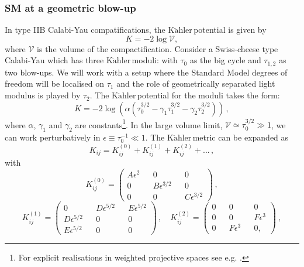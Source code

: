 \documentclass[11pt,a4paper]{article}
\newcommand{\V}{\mathcal{V}}
\newcommand{\Kahler}{\ensuremath{\text{K}\ddot{\text{a}}\text{hler}\,}}
\begin{document}
\subsubsection{SM at a geometric blow-up}
\label{twoblow}

In type IIB Calabi-Yau compatifications, the \Kahler potential is given by
%
\begin{equation}
    K = -2  \log {\mathcal{V}},
\end{equation}
%
where ${\mathcal{V}}$ is the volume of the compactification. Consider  a Swiss-cheese type Calabi-Yau which has three \Kahler moduli: with $\tau_0$ as the big cycle and $\tau_{1,2}$ as two blow-ups.  We  will work with a setup where the Standard Model degrees of freedom will be localised on $\tau_1$ and the role of geometrically separated light modulus is played by $\tau_2$. The \Kahler potential for the moduli takes the form:
\begin{equation}
K = -2 \log\left(\alpha\left(\tau_0^{3/2} - \gamma_1 \tau_1^{3/2} - \gamma_2 \tau_2^{3/2}\right)\right) \,,
\end{equation}
where  $\alpha$, $\gamma_1$ and $\gamma_2$ are constants\footnote{For explicit realisations in weighted projective spaces see  e.g. \cite{Blumenhagen:2007sm}.}. In the large volume limit, $\V \simeq \tau_0^{3/2} \gg 1$, we can work perturbatively in $\epsilon \equiv \tau_0^{-1} \ll 1$. The \Kahler metric can be expanded as
\begin{equation}
\label{eq:DecomposedMetric}
K_{ij} = K^{(0)}_{ij} + K^{(1)}_{ij} + K^{(2)}_{ij} + . . . \,,
\end{equation}
with
\begin{equation}
K^{(0)}_{ij} = 
\begin{pmatrix}
A \epsilon^2 && 0 && 0 \\
0 && B \epsilon^{3/2}  && 0 \\
0 && 0 && C \epsilon^{3/2}
\end{pmatrix} \,, \nonumber
\end{equation}
\begin{equation}
K^{(1)}_{ij} = 
\begin{pmatrix}
0 && D \epsilon^{5/2} && E \epsilon^{5/2}  \\
D \epsilon^{5/2} && 0 && 0 \\
E \epsilon^{5/2} && 0 && 0
\end{pmatrix} \,, \quad
K^{(2)}_{ij} =
\begin{pmatrix}
0 && 0 && 0 \\
0 && 0 && F \epsilon^{3} \\
0 && F \epsilon^{3} && 0 ,
\end{pmatrix} \ ,
\end{equation}
\end{document}
